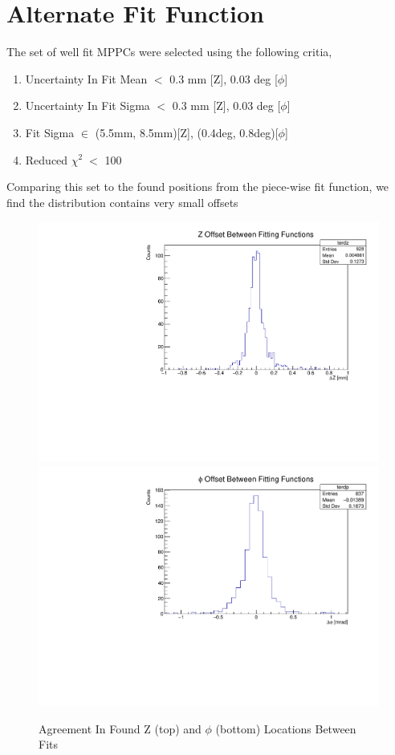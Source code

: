 \section{Alternate Fit Function}\label{app:fitfunccomp}
The set of well fit MPPCs were selected using the following critia,
\begin{enumerate}
    \item Uncertainty In Fit Mean $<$ 0.3 mm [Z], 0.03 deg [$\phi$]
    \item Uncertainty In Fit Sigma $<$ 0.3 mm [Z], 0.03 deg [$\phi$]
    \item Fit Sigma $\in$ (5.5mm, 8.5mm)[Z], (0.4deg, 0.8deg)[$\phi$]
    \item Reduced $\chi ^{2} \; <$ 100
\end{enumerate}

Comparing this set to the found positions from the piece-wise fit function, we find the distribution contains very small offsets

\begin{figure}[h]
    \centering
    \includegraphics[width=.7\linewidth]{graphics/terdzhc.pdf}
    \includegraphics[width=.7\linewidth]{graphics/terdphc.pdf}
    \caption{Agreement In Found Z (top) and $\phi$ (bottom) Locations Between Fits}
    \label{fig:fitcompare}
\end{figure}

